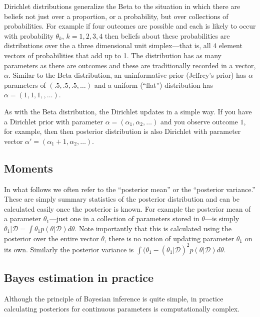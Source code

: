 \documentclass[
  12pt,
]{book}
\begin{document}
Dirichlet distributions generalize the Beta to the situation in which there are beliefs not just over a proportion, or a probability, but over collections of probabilities. For example if four outcomes are possible and each is likely to occur with probability \(\theta_k\), \(k=1,2,3,4\) then beliefs about these probabilities are distributions over the a three dimensional unit simplex---that is, all 4 element vectors of probabilities that add up to 1. The distribution has as many parameters as there are outcomes and these are traditionally recorded in a vector, \(\alpha\). Similar to the Beta distribution, an uninformative prior (Jeffrey's prior) has \(\alpha\) parameters of \((.5,.5,.5, \dots)\) and a uniform (``flat'') distribution has \(\alpha = (1,1,1,,\dots)\).

As with the Beta distribution, the Dirichlet updates in a simple way. If you have a Dirichlet prior with parameter \(\alpha = (\alpha_1, \alpha_2, \dots)\) and you observe outcome \(1\), for example, then then posterior distribution is also Dirichlet with parameter vector \(\alpha' = (\alpha_1+1, \alpha_2,\dots)\).

\hypertarget{moments}{%
\subsection{Moments}\label{moments}}

In what follows we often refer to the ``posterior mean'' or the ``posterior variance.'' These are simply summary statistics of the posterior distribution and can be calculated easily once the posterior is known. For example the posterior mean of a parameter \(\theta_1\)---just one in a collection of parameters stored in \(\theta\)---is simply \(\overline{\theta}_1 | \mathcal{D} = \int \theta_1 p(\theta | \mathcal{D}) d\theta\). Note importantly that this is calculated using the posterior over the entire vector \(\theta\), there is no notion of updating parameter \(\theta_1\) on its own. Similarly the posterior variance is \(\int (\theta_1 - (\overline{\theta}_1 | \mathcal{D})^2 p(\theta | \mathcal{D}) d\theta\).

\hypertarget{bayes-estimation-in-practice}{%
\subsection{Bayes estimation in practice}\label{bayes-estimation-in-practice}}

Although the principle of Bayesian inference is quite simple, in practice calculating posteriors for continuous parameters is computationally complex.
\end{document}
